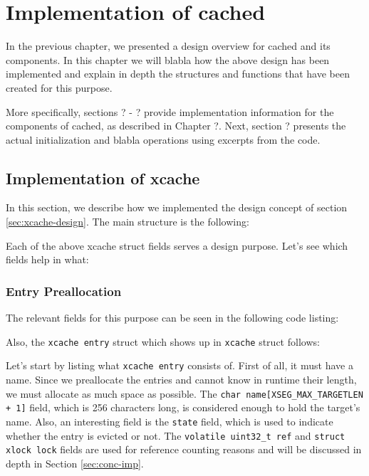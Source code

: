 \chapter{Implementation of cached}\label{ch:cached-implementation}

In the previous chapter, we presented a design overview for cached and its 
components. In this chapter we will blabla how the above design has been
implemented and explain in depth the structures and functions that have been 
created for this purpose.

More specifically, sections ? - ? provide implementation information for the 
components of cached, as described in Chapter ?. Next, section ? presents the 
actual initialization and blabla operations using excerpts from the code.

\section{Implementation of xcache}

In this section, we describe how we implemented the design concept of section 
\ref{sec:xcache-design}. The main \xcache structure is the following:


Each of the above xcache struct fields serves a design purpose.
Let's see which fields help in what:

\subsection{Entry Preallocation}

The relevant fields for this purpose can be seen in the following code listing:


Also, the \texttt{xcache entry} struct which shows up in \texttt{xcache} struct 
follows:


Let's start by listing what \texttt{xcache entry} consists of. First of all, it 
must have a name. Since we preallocate the entries and cannot know in runtime 
their length, we must allocate as much space as possible. The \texttt{char 
	name[XSEG\_MAX\_TARGETLEN + 1]} field, which is 256 characters long, is 
considered enough to hold the target's name. Also, an interesting field is the 
\texttt{state} field, which is used to indicate whether the entry is evicted or 
not. The \texttt{volatile uint32\_t ref} and \texttt{struct xlock lock} fields 
are used for reference counting reasons and will be discussed in depth in 
Section \ref{sec:conc-imp}.

